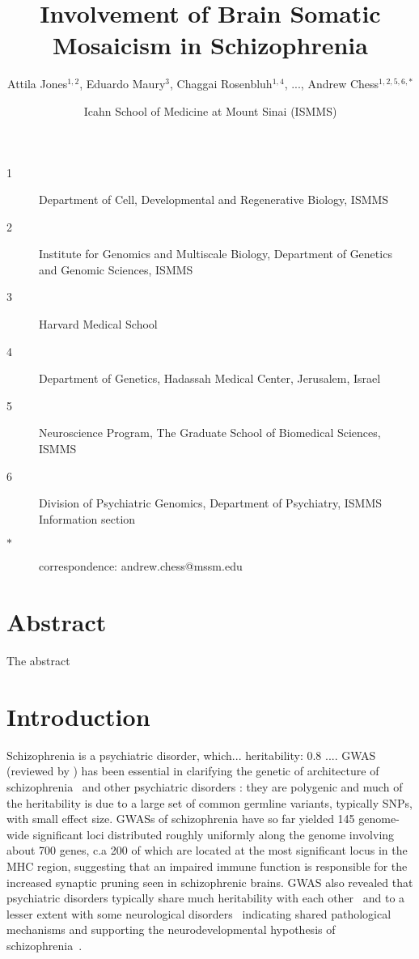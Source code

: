 \documentclass[letterpaper]{article}
\title{Involvement of Brain Somatic Mosaicism in Schizophrenia}
\author{Attila Jones\(^{1,2}\), Eduardo Maury\(^{3}\), Chaggai Rosenbluh\(^{1,4}\), ..., Andrew Chess\(^{1,2,5,6,\ast}\)}
\date{Icahn School of Medicine at Mount Sinai (ISMMS)}
\begin{document}
\maketitle

\begin{description}
\item[1] Department of Cell, Developmental and Regenerative Biology, ISMMS 
\item[2] Institute for Genomics and Multiscale Biology, Department of Genetics and Genomic Sciences, ISMMS 
\item[3] Harvard Medical School
\item[4] Department of Genetics, Hadassah Medical Center, Jerusalem, Israel
\item[5] Neuroscience Program, The Graduate School of Biomedical Sciences, ISMMS 
\item[6] Division of Psychiatric Genomics, Department of Psychiatry, ISMMS 
Information section
\item[\(\ast\)] correspondence: andrew.chess@mssm.edu 
\end{description}

\clearpage

\section*{Abstract}

The abstract

\section*{Introduction}

Schizophrenia is a psychiatric disorder, which... heritability: 0.8
...\citep{Kahn2015}.  GWAS (reviewed by \cite{Visscher2017}) has been
essential in clarifying the genetic of architecture of
schizophrenia~\citep{Ripke2014,Pardinas2018} and other psychiatric disorders
\citep{Sullivan2012}: they are polygenic and much of the heritability is due
to a large set of common germline variants, typically SNPs, with small effect
size.  GWASs of schizophrenia have so far yielded 145 genome-wide significant
loci distributed roughly uniformly along the genome involving about 700 genes,
c.a 200 of which are located at the most significant locus in the MHC region,
suggesting that an impaired immune function is responsible for the increased
synaptic pruning seen in schizophrenic brains.  GWAS also revealed that
psychiatric disorders typically share much heritability with each
other~\citep{Consortium2009,PsychiatricGenomicsConsortium2013} and to a lesser
extent with some neurological disorders~\citep{Consortium2018} indicating
shared pathological mechanisms and supporting the neurodevelopmental
hypothesis of schizophrenia~\citep{Nour2015}.
\end{document}

